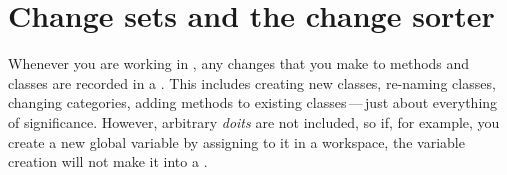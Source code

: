 \documentclass[a4paper,10pt,twoside]{book}
\begin{document}
\section{Change sets and the change sorter}
\label{sec:sc:changeSet}

Whenever you are working in \sq, any changes that you make to methods and classes are recorded in a .
This includes creating new classes, re-naming classes, changing categories, adding methods to existing classes\,---\,just about everything of significance.
However, arbitrary \emph{doits} are not included, so if, for example, you create a new global variable by assigning to it in a workspace, the variable creation will not make it into a .
\end{document}

